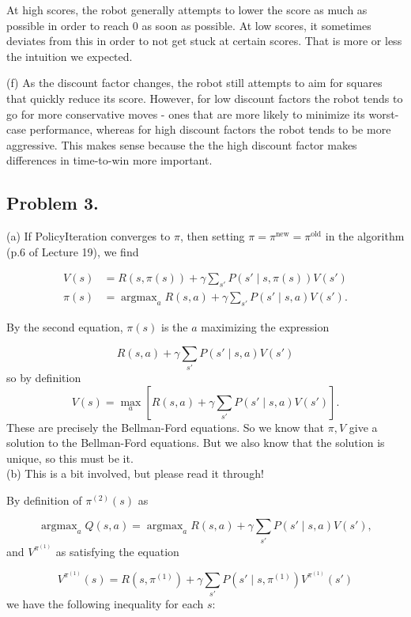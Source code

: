 \documentclass[12pt]{article}
\DeclareMathOperator{\argmax}{argmax}
\theoremstyle{remark}
\begin{document}
At high scores, the robot generally attempts to lower the score as much as possible in order to reach $0$ as soon as possible. At low scores, it sometimes deviates from this in order to not get stuck at certain scores. That is more or less the intuition we expected.

(f) As the discount factor changes, the robot still attempts to aim for squares that quickly reduce its score. However, for low discount factors the robot tends to go for more conservative moves - ones that are more likely to minimize its worst-case performance, whereas for high discount factors the robot tends to be more aggressive. This makes sense because the the high discount factor makes differences in time-to-win more important.\\




\subsection*{Problem 3.}(a) If PolicyIteration converges to $\pi$, then setting $\pi = \pi^{\text{new}} = \pi^{\text{old}}$ in the algorithm (p.6 of Lecture 19), we find

\begin{align*}
V(s) &= R(s, \pi(s)) + \gamma \sum_{s'} P(s' \mid s, \pi(s)) V(s') \\
\pi(s) &= \argmax_a R(s,a) + \gamma \sum_{s'} P(s' \mid s,a) V(s').
\end{align*}

By the second equation, $\pi(s)$ is the $a$ maximizing the expression

\[
R(s, a) + \gamma \sum_{s'} P(s' \mid s, a) V(s')
\]
so by definition
\[
V(s) = \max_a \left[ R(s,a) + \gamma \sum_{s'} P(s' \mid s,a) V(s') \right].
\]
These are precisely the Bellman-Ford equations. So we know that $\pi,V$ give a solution to the Bellman-Ford equations. But we also know that the solution is unique, so this must be it. \\


\noindent (b) This is a bit involved, but please read it through!


By definition of $\pi^{(2)}(s)$ as

\[
\argmax_a Q(s,a) = \argmax_a R(s,a) + \gamma \sum_{s'} P(s' \mid s,a) V(s'),
\]
and $V^{\pi^{(1)}}$ as satisfying the equation

\[
V^{\pi^{(1)}} (s) = R(s, \pi^{(1)}) + \gamma \sum_{s'} P(s' \mid s, \pi^{(1)} ) V^{\pi^{(1)}}(s')
\]
we have the following inequality for each $s$:
\end{document}
